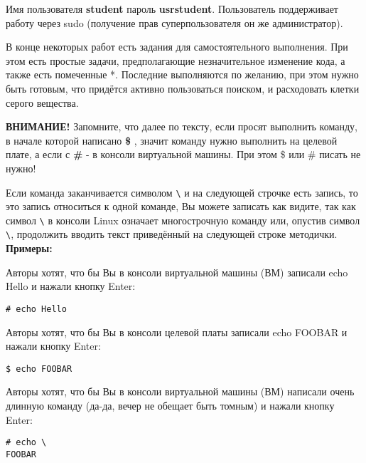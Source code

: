 Имя пользователя \textbf{student} пароль \textbf{usrstudent}. Пользователь поддерживает работу через sudo (получение прав суперпользователя он же администратор).

В конце некоторых работ есть задания для самостоятельного выполнения. При этом есть простые задачи, предполагающие незначительное изменение кода, а также есть помеченные *. Последние выполняются по желанию, при этом нужно быть готовым, что придётся активно пользоваться поиском, и расходовать клетки серого вещества.

\textbf{ВНИМАНИЕ!} Запомните, что далее по тексту, если просят выполнить команду, в начале которой написано \textbf{\$} , значит команду нужно выполнить на целевой плате, а если с \textbf{\#} - в консоли виртуальной машины. При этом \$ или \# писать не нужно! 

Если команда заканчивается символом \verb!\! и на следующей строчке есть запись, то это запись относиться к одной команде, Вы можете записать как видите, так как символ \verb!\! в консоли Linux означает многострочную команду или, опустив символ \verb!\!, продолжить вводить текст приведённый на следующей строке методички.\\


\textbf{Примеры:}

Авторы хотят, что бы Вы в консоли виртуальной машины (ВМ) записали echo Hello и нажали кнопку Enter:

\begin{lstlisting}[style=bash]
# echo Hello 
\end{lstlisting}

Авторы хотят, что бы Вы в консоли целевой платы записали echo FOOBAR и нажали кнопку Enter:

\begin{lstlisting}[style=bash]
$ echo FOOBAR
\end{lstlisting}

Авторы хотят, что бы Вы в консоли виртуальной машины (ВМ) написали очень длинную команду (да-да, вечер не обещает быть томным) и нажали кнопку  Enter:

\begin{lstlisting}[style=bash]
# echo \
FOOBAR 
\end{lstlisting}